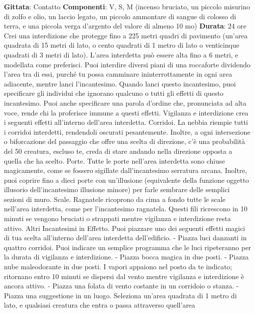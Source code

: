 \begin{multicols}{2}
\textbf{Gittata}: Contatto
\textbf{Componenti}: V, S, M (incenso bruciato, un piccolo
misurino di zolfo e olio, un laccio legato, un piccolo
ammontare di sangue di colosso di terra, e una piccola
verga d’argento del valore di almeno 10 mo)
\textbf{Durata}: 24 ore
Crei una interdizione che protegge fino a 225 metri
quadri di pavimento (un’area quadrata di 15 metri di
lato, o cento quadrati di 1 metro di lato o venticinque
quadrati di 3 metri di lato). L’area interdetta può essere
alta fino a 6 metri, e modellata come preferisci. Puoi
interdire diversi piani di una roccaforte dividendo l’area
tra di essi, purché tu possa camminare
ininterrottamente in ogni area adiacente, mentre lanci
l’incantesimo.
Quando lanci questo incantesimo, puoi specificare gli
individui che ignorano qualcuno o tutti gli effetti di
questo incantesimo. Puoi anche specificare una parola
d’ordine che, pronunciata ad alta voce, rende chi la
proferisce immune a questi effetti.
Vigilanza e interdizione crea i seguenti effetti all’interno
dell’area interdetta.
Corridoi. La nebbia riempie tutti i corridoi interdetti,
rendendoli oscurati pesantemente. Inoltre, a ogni
intersezione o biforcazione del passaggio che offre una
scelta di direzione, c’è una probabilità del 50%
creatura, escluso te, creda di stare andando nella
direzione opposta a quella che ha scelto.
Porte. Tutte le porte nell’area interdetta sono chiuse
magicamente, come se fossero sigillate
dall’incantesimo serratura arcana. Inoltre, puoi coprire
fino a dieci porte con un’illusione (equivalente della
funzione oggetto illusorio dell’incantesimo illusione
minore) per farle sembrare delle semplici sezioni di
muro.
Scale. Ragnatele ricoprono da cima a fondo tutte le
scale nell’area interdetta, come per l’incantesimo
ragnatela. Questi fili ricrescono in 10 minuti se vengono
bruciati o strappati mentre vigilanza e interdizione resta
attivo.
Altri Incantesimi in Effetto. Puoi piazzare uno dei
seguenti effetti magici di tua scelta all’interno dell’area
interdetta dell’edificio.
- Piazza luci danzanti in quattro corridoi. Puoi indicare
un semplice programma che le luci ripeteranno per
la durata di vigilanza e interdizione.
- Piazza bocca magica in due posti.
- Piazza nube maleodorante in due posti. I vapori
appaiono nel posto da te indicato; ritornano entro 10
minuti se dispersi dal vento mentre vigilanza e
interdizione è ancora attivo.
- Piazza una folata di vento costante in un corridoio o
stanza.
- Piazza una suggestione in un luogo. Seleziona
un’area quadrata di 1 metro di lato, e qualsiasi
creatura che entra o passa attraverso quell’area

\end{multicols}
